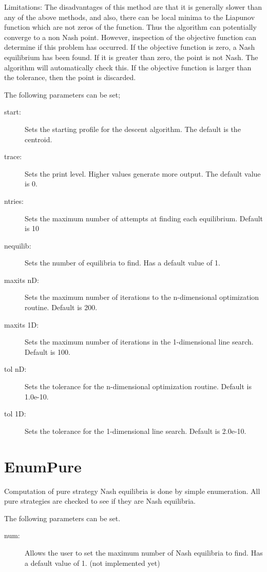 Limitations: The disadvantages of this method are that it is generally
slower than any of the above methods, and also,  there can be local minima
to the Liapunov function which are not zeros of the function.  Thus the
algorithm can potentially converge to a non Nash point.  However,
inspection of the objective function can determine if this problem has
occurred.  If the objective function is zero, a Nash equilibrium has been
found. If it is greater than zero, the point is not Nash.  The algorithm
will automatically check this.  If the objective function is larger than the
tolerance, then the point is discarded.

The following parameters can be set;

\begin{description}
\item[start:] Sets the starting profile for the descent algorithm.  The
default is the centroid.
\item[trace:] Sets the print level.  Higher values generate more output.
The default value is 0.
\item[ntries:] Sets the maximum number of attempts at finding each
equilibrium. Default is 10
\item[nequilib:] Sets the number of equilibria to find.  Has a default
value of 1.  
\item[maxits nD:] Sets the maximum number of iterations to the
n-dimensional optimization routine.  Default is 200.
\item[maxits 1D:] Sets the maximum number of iterations in the
1-dimensional line search.  Default is 100.
\item[tol nD:] Sets the tolerance for the n-dimensional optimization
routine.  Default is 1.0e-10.
\item[tol 1D:] Sets the tolerance for the 1-dimensional line search.
Default is 2.0e-10.
\end{description}

\section{EnumPure}
Computation of pure strategy Nash equilibria is done by simple enumeration.
All pure strategies are checked to see if they are Nash equilibria.  

The following parameters can be set. 

\begin{description}
\item[num:] Allows the user to set the maximum number of Nash equilibria to
find.  Has a default value of 1. (not implemented yet) 
\end{description}

